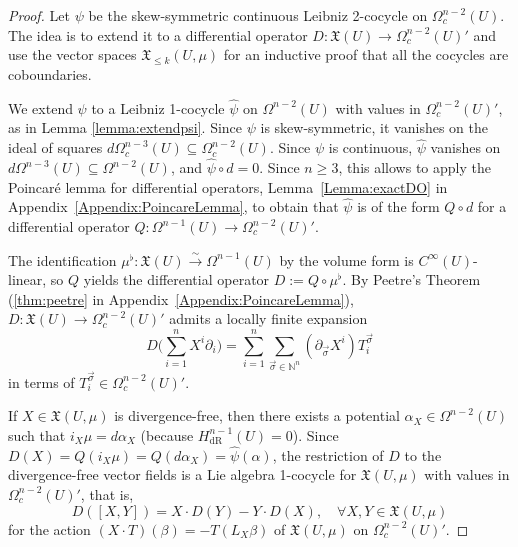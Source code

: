 \documentclass{article}
\newcommand{\fX}{\mathfrak{X}}
\theoremstyle{definition}
\begin{document}
\begin{proof}
Let $\psi$ be the skew-symmetric continuous Leibniz 2-cocycle on $\Omega_c^{n-2}(U)$. The idea is to extend it to a differential operator 
$D \colon \fX(U) \rightarrow \Omega^{n-2}_{c}(U)'$
and use the vector spaces $\fX_{\leq k}(U, \mu)$ for an inductive proof that all the cocycles are coboundaries.


We extend $\psi$ to a Leibniz 1-cocycle $\widehat\psi$ on $\Omega^{n-2}(U)$ with values in $\Omega^{n-2}_{c}(U)'$, as in Lemma \ref{lemma:extendpsi}. Since $\psi$ is skew-symmetric, it vanishes on the ideal of squares $d\Omega^{n-3}_{c}(U) \subseteq \Omega^{n-2}_{c}(U)$. 
Since $\psi$ is continuous, $\widehat{\psi}$ vanishes on $d\Omega^{n-3}(U) \subseteq \Omega^{n-2}(U)$, and $\widehat\psi\circ d=0$.
Since $n\geq 3$, this allows to apply  the Poincar\'e lemma for differential operators, Lemma~\ref{Lemma:exactDO} in Appendix~\ref{Appendix:PoincareLemma},
to obtain that $\widehat\psi$ is of the form $Q \circ d$ for a differential operator 
$Q \colon \Omega^{n-1}(U) \rightarrow \Omega^{n-2}_{c}(U)'$.

The identification $\mu^{\flat} \colon \fX(U) \xrightarrow{\sim} \Omega^{n-1}(U)$ by 
the volume form is $C^{\infty}(U)$-linear, so $Q$ yields the differential operator $D:=Q \circ \mu^{\flat}$. 
By Peetre's Theorem (\ref{thm:peetre} in Appendix~\ref{Appendix:PoincareLemma}),  $D\colon \fX(U) \rightarrow \Omega^{n-2}_{c}(U)'$ admits a locally finite expansion
\begin{equation}\label{trei}
D\Big(\sum_{i=1}^nX^i\partial _i\Big) = \sum_{i=1}^n\sum_{\vec{\sigma} \in \mathbb{N}^{n}}
(\partial_{\vec\sigma}X^i)T^{\vec{\sigma}}_{i}
\end{equation}
in terms of $T^{\vec{\sigma}}_{i} \in \Omega^{n-2}_{c}(U)'$. 

If $X \in \fX(U, \mu)$ is divergence-free, then there exists a potential $\alpha_{X} \in \Omega^{n-2}(U)$ such that $i_{X}\mu = d\alpha_{X}$ 
(because $H^{n-1}_{\mathrm{dR}}(U) = 0$).
Since $D(X) = Q(i_{X}\mu) = Q(d\alpha_{X}) = \widehat{\psi}(\alpha)$, the restriction of $D$ to the divergence-free vector fields is a Lie algebra 1-cocycle
for $\fX(U, \mu)$ with values in $\Omega_c^{n-2}(U)'$, that is, 
\begin{equation}\label{eq:OneC}
D([X,Y]) = X \cdot D(Y) - Y \cdot D(X),\quad \forall X,Y\in  \fX(U, \mu)
\end{equation}
for the action $(X\cdot T)(\beta)=-T(L_X \beta)$ of $\fX(U,\mu)$ on $\Omega_c^{n-2}(U)'$.





\end{proof}
\end{document}
